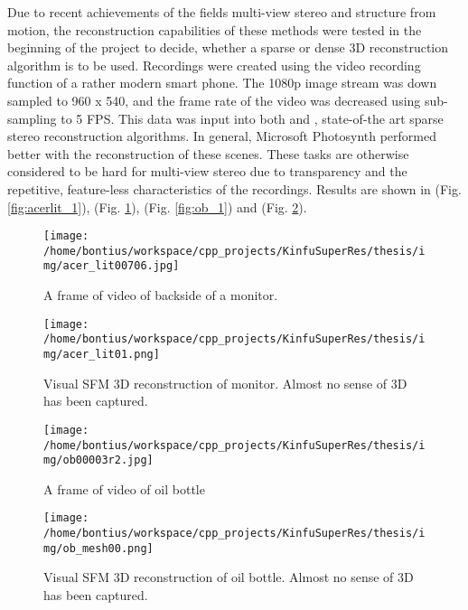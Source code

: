 \documentclass{ucl_thesis}
\newcommand{\figref}[1]{(Fig. \ref{#1})}
\begin{document}
\par Due to recent achievements of the fields multi-view stereo and structure from motion, the reconstruction capabilities of these methods were tested in the beginning of the project to decide, whether a sparse or dense 3D reconstruction algorithm is to be used. Recordings were created using the video recording function of a rather modern smart phone. The 1080p image stream was down sampled to 960 x 540, and the frame rate of the video was decreased using sub-sampling to 5 FPS. This data was input into both \citep{Photosynth} and \citep{vsfm}, state-of-the art sparse stereo reconstruction algorithms. In general, Microsoft Photosynth performed better with the reconstruction of these scenes. These tasks are otherwise considered to be hard for multi-view stereo due to transparency and the repetitive, feature-less characteristics of the recordings. Results are shown in \figref{fig:acerlit_1}, \figref{fig:acerlit_mesh}, \figref{fig:ob_1} and \figref{fig:ob_mesh}.

\begin{figure}[h!]\centering
	\begin{minipage}[b]{0.4\linewidth}\centering
		\texttt{[image: /home/bontius/workspace/cpp\_projects/KinfuSuperRes/thesis/img/acer\_lit00706.jpg]}
		\caption{A frame of video of backside of a monitor.}
		\label{fig:acerlit_1}
	\end{minipage}
	\begin{minipage}[b]{0.49\linewidth}\centering
		\texttt{[image: /home/bontius/workspace/cpp\_projects/KinfuSuperRes/thesis/img/acer\_lit01.png]}
		\caption{Visual SFM 3D reconstruction of monitor. Almost no sense of 3D has been captured.}
		\label{fig:acerlit_mesh}
	\end{minipage}
\end{figure}

\begin{figure}[h!]\centering
	\begin{minipage}[b]{0.49\linewidth}\centering
		\texttt{[image: /home/bontius/workspace/cpp\_projects/KinfuSuperRes/thesis/img/ob00003r2.jpg]}
		\caption{A frame of video of oil bottle}
		\label{fig:ob_1}
	\end{minipage}
	\begin{minipage}[b]{0.49\linewidth}\centering
		\texttt{[image: /home/bontius/workspace/cpp\_projects/KinfuSuperRes/thesis/img/ob\_mesh00.png]}
		\caption{Visual SFM 3D reconstruction of oil bottle. Almost no sense of 3D has been captured.}
		\label{fig:ob_mesh}
	\end{minipage}
\end{figure}
\end{document}
